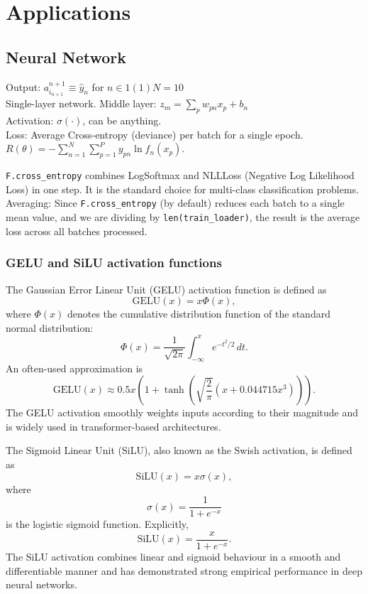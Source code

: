 \chapter{Applications}
\section{Neural Network}
Output: $a^{n+1}_{i_{n+1}} \equiv \hat y_n$ for $n \in 1(1)N{=}10$\\
Single-layer network. Middle layer: $z_m = \sum_p w_{pn} x_p + b_n$\\
Activation: $\sigma(\cdot)$, can be anything.\\
Loss: Average Cross-entropy (deviance) per batch for a single epoch. $R(\theta) = - \sum_{n=1}^{N} \sum_{p=1}^{P} y_{pn} \ln f_n(x_p)$.

\texttt{F.cross\_entropy} combines LogSoftmax and NLLLoss (Negative Log Likelihood Loss) in one step. It is the standard choice for multi-class classification problems.\\
Averaging: Since \texttt{F.cross\_entropy} (by default) reduces each batch to a single mean value, and we are dividing by \texttt{len(train\_loader)}, the result is the average loss across all batches processed.

\subsection{GELU and SiLU activation functions}\label{subsec:GELUSilU}
The Gaussian Error Linear Unit (GELU) activation function is defined as
\[
\mathrm{GELU}(x)
=
x\Phi(x),
\]
where $\Phi(x)$ denotes the cumulative distribution function of the standard normal distribution:
\[
\Phi(x)
=
\frac{1}{\sqrt{2\pi}}
\int_{-\infty}^{x}
e^{-t^{2}/2}\,dt.
\]
An often-used approximation is
\[
\mathrm{GELU}(x)
\approx
0.5x\left(
1+\tanh\left(
\sqrt{\frac{2}{\pi}}
\left(x+0.044715x^{3}\right)
\right)
\right).
\]
The GELU activation smoothly weights inputs according to their magnitude and is widely used in transformer-based architectures.

The Sigmoid Linear Unit (SiLU), also known as the Swish activation, is defined as
\[
\mathrm{SiLU}(x)
=
x\sigma(x),
\]
where
\[
\sigma(x)
=
\frac{1}{1+e^{-x}}
\]
is the logistic sigmoid function. Explicitly,
\[
\mathrm{SiLU}(x)
=
\frac{x}{1+e^{-x}}.
\]
The SiLU activation combines linear and sigmoid behaviour in a smooth and differentiable manner and has demonstrated strong empirical performance in deep neural networks.